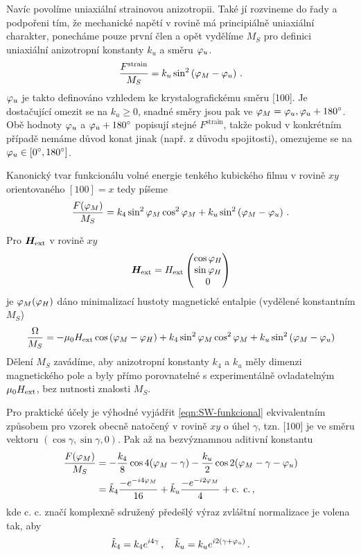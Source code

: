 Navíc povolíme uniaxiální strainovou anizotropii.
Také jí rozvineme do řady a podpořeni tím, že mechanické napětí v rovině má principiálně uniaxiální charakter, ponecháme pouze první člen a opět vydělíme $M_S$ pro definici uniaxiální anizotropní konstanty $k_u$ a směru $\varphi_u$.
\begin{equation}
    \frac{F^\textrm{strain}}{M_S}=k_u \sin^2\left( \varphi_M-\varphi_u  \right) \,.
\end{equation}
$\varphi_u$ je takto definováno vzhledem ke krystalografickému směru [100].
Je dostačující omezit se na $k_u\geq 0$, snadné směry jsou pak ve $\varphi_M=\varphi_u, \varphi_u+\SI{180}{\degree}$.
Obě hodnoty $\varphi_u$ a $\varphi_u+\SI{180}{\degree}$ popisují stejné $F^\textrm{strain}$, takže pokud v konkrétním případě nemáme důvod konat jinak (např. z důvodu spojitosti), omezujeme se na $\varphi_u \in [\SI{0}{\degree}, \SI{180}{\degree}]$.

Kanonický tvar funkcionálu volné energie tenkého kubického filmu v rovině $xy$ orientovaného $[100]=x$ tedy píšeme
\begin{equation}
\label{eqn:SW-funkcional}
    \frac{F(\varphi_M)}{M_S}=k_4 \sin^2 \varphi_M \cos^2 \varphi_M + k_u \sin^2\left( \varphi_M-\varphi_u  \right) \,.
\end{equation}

Pro $\bm{H}_\textrm{ext}$ v rovině $xy$
\begin{equation}
    \bm{H}_\textrm{ext} =H_\textrm{ext} \begin{pmatrix} \cos \varphi_H \\ \sin \varphi_H \\ 0 \end{pmatrix}
\end{equation}
je $\varphi_M(\varphi_H)$ dáno minimalizací hustoty magnetické entalpie (vydělené konstantním $M_S$)
\begin{equation}
    \label{eqn:magneticka-entalpie-v-rovine}
    \frac{\Omega}{M_S}=-\mu_0 H_\textrm{ext} \cos \left(\varphi_M-\varphi_H \right) + k_4 \sin^2 \varphi_M \cos^2 \varphi_M + k_u \sin^2\left( \varphi_M-\varphi_u  \right)
\end{equation}
Dělení $M_S$ zavádíme, aby anizotropní konstanty $k_4$ a $k_u$ měly dimenzi magnetického pole a byly přímo porovnatelné s experimentálně ovladatelným $\mu_0H_\textrm{ext}$, bez nutnosti znalosti $M_S$.

Pro praktické účely je výhodné vyjádřit \eqref{eqn:SW-funkcional} ekvivalentním způsobem pro vzorek obecně natočený v rovině $xy$ o úhel $\gamma$, tzn. [100] je ve směru vektoru $(\cos\gamma, \sin\gamma, 0)$.
Pak až na bezvýznamnou aditivní konstantu
\begin{align}
\label{eqn:funkcional-otoceny}
    \frac{F(\varphi_M)}{M_S}&=-\frac{k_4}{8} \cos 4(\varphi_M-\gamma)-\frac{k_u}{2} \cos 2(\varphi_M-\gamma-\varphi_u) \\
                        &=\tilde{k}_4 \frac{-e^{-i4\varphi_M}}{16} + \tilde{k}_u \frac{-e^{-i2\varphi_M}}{4} + \textrm{c. c.}\,,
\end{align}
kde c. c. značí komplexně sdružený předešlý výraz zvláštní normalizace je volena tak, aby
\begin{equation}
\label{eqn:tilda-k}
    \tilde{k}_4 = k_4 e^{i4\gamma} \,, \quad \tilde{k}_u = k_u e^{i2(\gamma+\varphi_u)} \,.
\end{equation}

